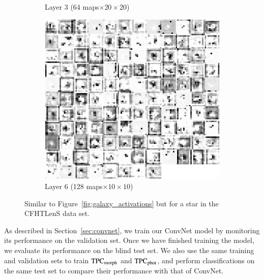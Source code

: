 \documentclass[fleqn,usenatbib]{mnras}
\begin{document}
\begin{figure}
\begin{subfigure}[c]{0.24\linewidth}
    \caption{Layer 3 (64 maps$\times20\times20$)}
  \end{subfigure}
  \hfill
  \begin{subfigure}[c]{0.24\linewidth}
  \centering
    \includegraphics[width=\textwidth]{figures/star_conv31.pdf}
    \caption{Layer 6 (128 maps$\times10\times10$)}
  \end{subfigure}
  \caption{
    Similar to Figure~\ref{fig:galaxy_activations} but for a star in the
    CFHTLenS data set.
    }
  \label{fig:star_activations}
\end{figure}

As described in Section~\ref{sec:convnet},
we train our ConvNet model by monitoring its performance on the validation set.
Once we have finished training the model,
we evaluate its performance on the blind test set.
We also use the same training and validation sets to train 
${\mathrm{TPC}}_{{\mathrm{morph}}}$ and ${\mathrm{TPC}}_{{\mathrm{phot}}}$, and
perform classifications on the same test set to compare their performance
with that of ConvNet.
\end{document}
